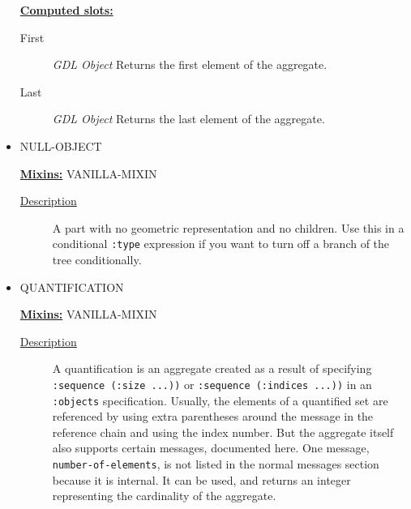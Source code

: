 \documentclass [11pt]{book}
\begin{document}
\begin{itemize}
\textbf{
\underline{Computed slots:}}

\begin{description}

\item [First]
\emph{GDL Object} Returns the first element of the aggregate.


\item [Last]
\emph{GDL Object} Returns the last element of the aggregate.


\end{description}







\item {}NULL-OBJECT


\textbf{
\underline{Mixins:}} VANILLA-MIXIN





\begin{description}

\item [
\underline{Description}]


A part with no geometric representation and no children. Use this in a 
conditional \texttt{:type} expression if you want to turn off a branch of the tree conditionally.



\end{description}









\item {}QUANTIFICATION


\textbf{
\underline{Mixins:}} VANILLA-MIXIN





\begin{description}

\item [
\underline{Description}]


A quantification is an aggregate created as a result of specifying \texttt{:sequence (:size ...))} or
\texttt{:sequence (:indices ...))} in an \texttt{:objects} specification. Usually, the elements of a quantified set are referenced by using
extra parentheses around the message in the reference chain and using the index number. But the aggregate itself also supports certain
messages, documented here. One message, \texttt{number-of-elements}, is not listed in the normal messages section because it is 
internal. It can be used, and returns an integer representing the cardinality of the aggregate.




\end{description}
\end{itemize}
\end{document}
